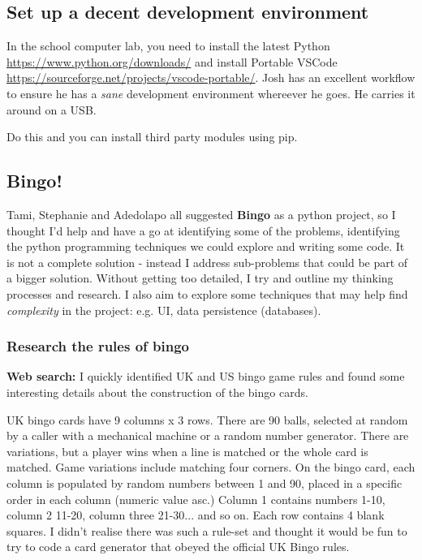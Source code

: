 \documentclass[11pt]{article}
\begin{document}
    \subsection{Set up a decent development
environment}\label{set-up-a-decent-development-environment}

    In the school computer lab, you need to install the latest Python
\url{https://www.python.org/downloads/} and install Portable VSCode
\url{https://sourceforge.net/projects/vscode-portable/}. Josh has an
excellent workflow to ensure he has a \emph{sane} development
environment whereever he goes. He carries it around on a USB.

Do this and you can install third party modules using pip.

    \subsection{Bingo!}\label{bingo}

    Tami, Stephanie and Adedolapo all suggested \textbf{Bingo} as a python
project, so I thought I'd help and have a go at identifying some of the
problems, identifying the python programming techniques we could explore
and writing some code. It is not a complete solution - instead I address
sub-problems that could be part of a bigger solution. Without getting
too detailed, I try and outline my thinking processes and research. I
also aim to explore some techniques that may help find \emph{complexity}
in the project: e.g. UI, data persistence (databases).

    \subsubsection{Research the rules of
bingo}\label{research-the-rules-of-bingo}

    \textbf{Web search:} I quickly identified UK and US bingo game rules and
found some interesting details about the construction of the bingo
cards.

UK bingo cards have 9 columns x 3 rows. There are 90 balls, selected at
random by a caller with a mechanical machine or a random number
generator. There are variations, but a player wins when a line is
matched or the whole card is matched. Game variations include matching
four corners. On the bingo card, each column is populated by random
numbers between 1 and 90, placed in a specific order in each column
(numeric value asc.) Column 1 contains numbers 1-10, column 2 11-20,
column three 21-30... and so on. Each row contains 4 blank squares. I
didn't realise there was such a rule-set and thought it would be fun to
try to code a card generator that obeyed the official UK Bingo rules.
\end{document}
